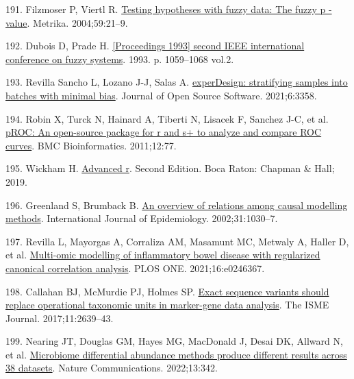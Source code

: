 \documentclass[
  12pt,
  a4paper,
  twoside,
  openright]{book}
\newlength{\cslhangindent}
\newlength{\cslentryspacingunit} %
\newenvironment{CSLReferences}[2] %
 {%
  \setlength{\parindent}{0pt}
  \ifodd #1
  \let\oldpar\par
  \def\par{\hangindent=\cslhangindent\oldpar}
  \fi
  \setlength{\parskip}{#2\cslentryspacingunit}
 }%
 {}
\begin{document}
\begin{CSLReferences}{0}{0}
\leavevmode{}%
191. Filzmoser P, Viertl R. \href{https://doi.org/10.1007/s001840300269}{Testing hypotheses with fuzzy data: The fuzzy p -value}. Metrika. 2004;59:21--9.

\leavevmode{}%
192. Dubois D, Prade H. \href{https://doi.org/10.1109/FUZZY.1993.327367}{{[}Proceedings 1993{]} second IEEE international conference on fuzzy systems}. 1993. p. 1059--1068 vol.2.

\leavevmode{}%
193. Revilla Sancho L, Lozano J-J, Salas A. \href{https://doi.org/10.21105/joss.03358}{experDesign: stratifying samples into batches with minimal bias}. Journal of Open Source Software. 2021;6:3358.

\leavevmode{}%
194. Robin X, Turck N, Hainard A, Tiberti N, Lisacek F, Sanchez J-C, et al. \href{https://doi.org/10.1186/1471-2105-12-77}{pROC: An open-source package for r and s+ to analyze and compare ROC curves}. BMC Bioinformatics. 2011;12:77.

\leavevmode{}%
195. Wickham H. \href{https://adv-r.hadley.nz/index.html}{Advanced r}. Second Edition. Boca Raton: Chapman \& Hall; 2019.

\leavevmode{}%
196. Greenland S, Brumback B. \href{https://doi.org/10.1093/ije/31.5.1030}{An overview of relations among causal modelling methods}. International Journal of Epidemiology. 2002;31:1030--7.

\leavevmode{}%
197. Revilla L, Mayorgas A, Corraliza AM, Masamunt MC, Metwaly A, Haller D, et al. \href{https://doi.org/10.1371/journal.pone.0246367}{Multi-omic modelling of inflammatory bowel disease with regularized canonical correlation analysis}. PLOS ONE. 2021;16:e0246367.

\leavevmode{}%
198. Callahan BJ, McMurdie PJ, Holmes SP. \href{https://doi.org/10.1038/ismej.2017.119}{Exact sequence variants should replace operational taxonomic units in marker-gene data analysis}. The ISME Journal. 2017;11:2639--43.

\leavevmode{}%
199. Nearing JT, Douglas GM, Hayes MG, MacDonald J, Desai DK, Allward N, et al. \href{https://doi.org/10.1038/s41467-022-28034-z}{Microbiome differential abundance methods produce different results across 38 datasets}. Nature Communications. 2022;13:342.


\end{CSLReferences}
\end{document}
